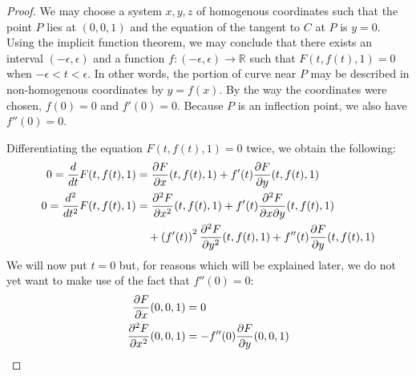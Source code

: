 \documentclass[12pt]{article}
\begin{document}
\begin{proof}
We may choose a system $x,y,z$ of homogenous coordinates 
such that the point $P$ lies at $(0,0,1)$ and the equation 
of the tangent to $C$ at $P$ is $y = 0$.  Using the 
implicit function theorem, we may conclude that there
exists an interval $(-\epsilon,\epsilon)$ and a function
$f \colon (-\epsilon,\epsilon) \to \mathbb{R}$ such that
$F(t, f(t), 1) = 0$ when $-\epsilon < t < \epsilon$.  In
other words, the portion of curve near $P$ may be described
in non-homogenous coordinates by $y = f(x)$.  By the way
the coordinates were chosen, $f(0) = 0$ and $f'(0) = 0$.
Because $P$ is an inflection point, we also have $f''(0) = 0$.

Differentiating the equation $F(t, f(t), 1) = 0$ twice,
we obtain the following:
\begin{align*}
 0 = {d \over dt} F(t, f(t), 1) &=
   {\partial F \over \partial x} (t, f(t), 1) +
   f'(t) {\partial F \over \partial y} (t, f(t), 1)
\\
 0 = {d^2 \over dt^2} F(t, f(t), 1) &=
   {\partial^2 F \over \partial x^2} (t, f(t), 1) +
   f'(t) {\partial^2 F \over \partial x \partial y} (t, f(t), 1) \\ &\quad+
   \left(f'(t)\right)^2 {\partial^2 F \over \partial y^2} (t, f(t), 1) +
   f''(t) {\partial F \over \partial y} (t, f(t), 1)
\end{align*}
We will now put $t=0$ but, for reasons which will be 
explained later, we do not yet want to make use of the
fact that $f''(0) = 0$:
\begin{align*}
 {\partial F \over \partial x} (0,0,1) &= 0 \\
 {\partial^2 F \over \partial x^2} (0,0,1) &= 
 -f''(0) {\partial F \over \partial y} (0,0,1) 
\end{align*}


\end{proof}
\end{document}
